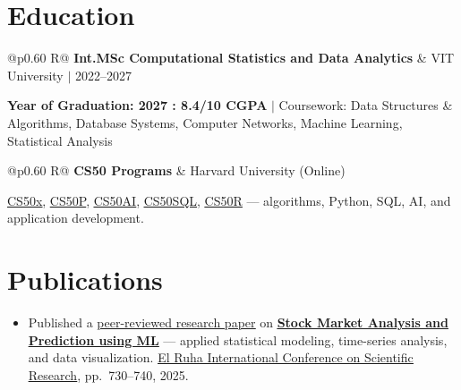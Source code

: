 \documentclass[a4paper,10pt]{article}
\newcommand{\ulink}[2]{\href{#1}{\uline{#2}}}
\newcommand{\subheading}[1]{{\color[HTML]{0A0A0A}\fontsize{12}{14}\selectfont\bfseries #1}}
\newcommand{\meta}[1]{{\color[HTML]{5C5C5C}\fontsize{10.5}{12.5}\selectfont #1}}
\begin{document}
\vspace{2pt}

\section{Education}
\vspace{2pt}

\begin{tabularx}{\linewidth}{@{}p{0.60\linewidth} R@{}}
\subheading{Int.MSc Computational Statistics and Data Analytics} & \meta{VIT University $|$ 2022--2027}
\end{tabularx}
\vspace{1pt}
{\color[HTML]{3A3A3A}\fontsize{11}{14}\selectfont \textbf{Year of Graduation: 2027 : 8.4/10 CGPA} $|$ Coursework: Data Structures \& Algorithms, Database Systems, Computer Networks, Machine Learning, Statistical Analysis}

\begin{tabularx}{\linewidth}{@{}p{0.60\linewidth} R@{}}
\subheading{CS50 Programs} & \meta{Harvard University (Online)}
\end{tabularx}
\vspace{1pt}
{\color[HTML]{3A3A3A}\fontsize{11}{14}\selectfont \ulink{https://cs50.harvard.edu/certificates/b14b78df-e05c-413e-a607-1dd27303053a}{CS50x}, \ulink{https://cs50.harvard.edu/certificates/32477052-9db4-49c4-a5a4-d7e58429ca2c}{CS50P}, \ulink{https://cs50.harvard.edu/certificates/9cdb4d4a-1250-4f8e-9fd7-191864e0f919}{CS50AI}, \ulink{https://cs50.harvard.edu/certificates/bc486f24-f085-4e61-8536-80940b97a1b9}{CS50SQL}, \ulink{https://cs50.harvard.edu/certificates/666838e6-a053-4d82-b179-a60fe745fd84}{CS50R} --- algorithms, Python, SQL, AI, and application development.}

\vspace{2pt}

\section{Publications}
\vspace{2pt}
\begin{itemize}[nosep, leftmargin=1.5em, itemsep=1pt, topsep=2pt]
  \item {\color[HTML]{0A0A0A}\fontsize{11}{14}\selectfont
  Published a \ulink{https://www.elruha.org/_files/ugd/614b1f_6b95e1b697bf452b9907ba46e0151c05.pdf\#page=774}{peer-reviewed research paper} on \ulink{https://github.com/su-jin1425/Set-Project}{\textbf{Stock Market Analysis and Prediction using ML}} --- applied statistical modeling, time-series analysis, and data visualization. \ulink{https://www.elruha.org/congress-books}{El Ruha International Conference on Scientific Research}, pp.\ 730--740, 2025.}
\end{itemize}
\end{document}
